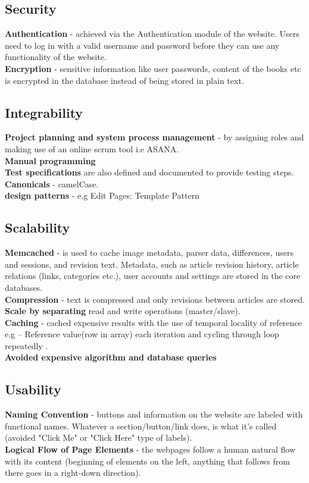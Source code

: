 \subsection{Security}
\par{\textbf{Authentication} - achieved via the Authentication module of the website. Users need to log in with a valid username and password before they can use any functionality of the website. \\\textbf{Encryption} - sensitive information like user passwords, content of the books etc is encrypted in the database instead of being stored in plain text. }

\subsection{Integrability}
\par{\textbf{Project planning and system process management} - by assigning roles and making use of an online scrum tool i.e ASANA.
\\\textbf{Manual programming}
\\\textbf{Test specifications} are also defined and documented to provide testing steps.
\\\textbf{Canonicals} - camelCase.
\\\textbf{design patterns} - e.g Edit Pages: Template Pattern}

\subsection{Scalability}
\par{\textbf{Memcached} - is used to cache image metadata, parser data, differences, users and sessions, and revision text. Metadata, such as article revision history, article relations (links, categories etc.), user accounts and settings are stored in the core databases.
\\\textbf{Compression} - text is compressed and only revisions between articles are stored. 
\\\textbf{Scale by separating} read and write operations (master/slave).
\\\textbf{Caching} - cached expensive results with the use of temporal locality of reference e.g – Reference value(row in array) each iteration and cycling through loop repeatedly .
\\\textbf{Avoided expensive algorithm and database queries}
}
\subsection{Usability}
\par{\textbf{Naming Convention} - buttons and information on the website are labeled with functional names. Whatever a section/button/link does, is what it's called (avoided "Click Me" or "Click Here" type of labels). \\\textbf{Logical Flow of Page Elements} - the webpages follow a human natural flow with its content (beginning of elements on the left, anything that follows from there goes in a right-down direction). }